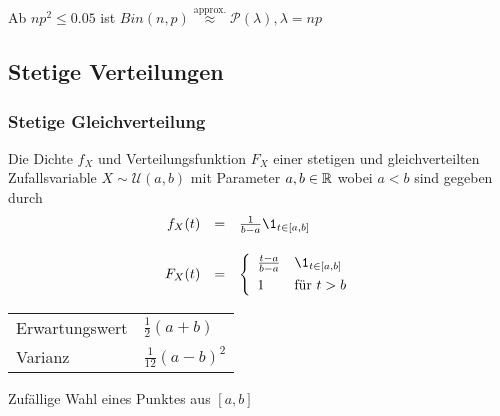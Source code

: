 \begin{highlight}
	\begin{definition}[Faustregel]
		Ab \(np^2 \leq 0.05\) ist \(Bin(n,p) \stackrel{\text{approx.}}{ \approx } \mathcal{P}(\lambda), \lambda = np\)
	\end{definition}
\end{highlight}






\subsection{Stetige Verteilungen}




\subsubsection{Stetige Gleichverteilung}
Die Dichte \(f_X\) und Verteilungsfunktion \(F_X\) einer stetigen und gleichverteilten Zufallsvariable \(X \sim \mathcal{U}(a,b)\) mit Parameter \(a,b \in \mathbb{R}\) wobei \(a < b\) sind gegeben durch
\[
	\begin{array}{rcl}
		f_X(t) & = & \frac{1}{b-a} \1_{t \in [a,b]}


		\\[1.5em]
		F_X(t) & = &
		\left\{\begin{array}{ll}
			\frac{t-a}{b-a} & \1_{t \in [a,b]}  \\[1ex]
			1               & \text{für } t > b
		\end{array}\right.
	\end{array}
\]

\begin{highlight}
	\begin{tabular}{l@{ : }l}
		Erwartungswert & \(\frac{1}{2}(a+b)\)    \\
		Varianz        & \(\frac{1}{12}(a-b)^2\)
	\end{tabular}
\end{highlight}

\begin{example}
	Zufällige Wahl eines Punktes aus \([a,b]\)
\end{example}

